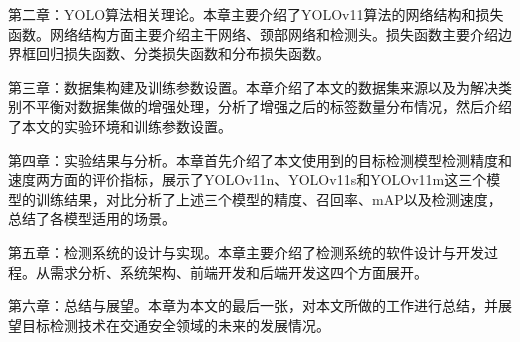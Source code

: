 第二章：YOLO算法相关理论。本章主要介绍了YOLOv11算法的网络结构和损失函数。网络结构方面主要介绍主干网络、颈部网络和检测头。损失函数主要介绍边界框回归损失函数、分类损失函数和分布损失函数。

第三章：数据集构建及训练参数设置。本章介绍了本文的数据集来源以及为解决类别不平衡对数据集做的增强处理，分析了增强之后的标签数量分布情况，然后介绍了本文的实验环境和训练参数设置。

第四章：实验结果与分析。本章首先介绍了本文使用到的目标检测模型检测精度和速度两方面的评价指标，展示了YOLOv11n、YOLOv11s和YOLOv11m这三个模型的训练结果，对比分析了上述三个模型的精度、召回率、mAP以及检测速度，总结了各模型适用的场景。

第五章：检测系统的设计与实现。本章主要介绍了检测系统的软件设计与开发过程。从需求分析、系统架构、前端开发和后端开发这四个方面展开。

第六章：总结与展望。本章为本文的最后一张，对本文所做的工作进行总结，并展望目标检测技术在交通安全领域的未来的发展情况。
